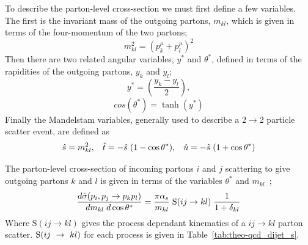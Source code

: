 To describe the parton-level cross-section we must first define a few variables.
The first is the invariant mass of the outgoing partons, $m_{kl}$, which is given in terms of the four-momentum of the two partons;
\begin{equation}
  m_{kl}^2 = (p^\mu_k + p^\mu_l)^2  
\end{equation}
\noindent
Then there are two related angular variables, $y^*$ and $\theta^*$,
defined in terms of the rapidities of the outgoing partons, $y_k$ and $y_l$;
\begin{equation}
  y^* = (\frac{y_k - y_l}{2}),
\end{equation}
\begin{equation}
  cos(\theta^*) = \tanh(y^*)
\end{equation}
\noindent
Finally the Mandelstam variables, generally used to describe a 2$\to$2 particle scatter event, are defined as 
\begin{equation}
  \hat{s} = m_{kl}^2, \hspace{3mm}  \hat{t} = -\hat{s}\hspace{1mm}(1 - \cos{\theta^*}), \hspace{3mm} \hat{u} = - \hat{s}\hspace{1mm}(1+\cos{\theta^*})
\end{equation}

\noindent
The parton-level cross-section of incoming partons $i$ and $j$ scattering to give
outgoing partons $k$ and $l$ is given in terms of the variables $\theta^*$ and $m_{kl}$~\cite{theo-dijet_harris};
\begin{equation}
  \frac{d\hat{\sigma}(p_i, p_j \to p_k p_l)}{dm_{kl}\hspace{1mm}d\cos{\theta^*}} = \frac{ \pi \alpha_s}{m_{kl}}\hspace{1mm} \text{S}(ij \to kl) \hspace{1mm} \frac{1}{1+\delta_{kl}}
  \label{eq:theo-qcd_dijet_xs}
\end{equation}
Where $\text{S}(ij \to kl)$ gives the process dependant kinematics of a $ij \to kl$  parton scatter.
$\text{S}\nobreak(ij~\to~kl)$ for each process is given in Table~\ref{tab:theo-qcd_dijet_s}.

%    
%

